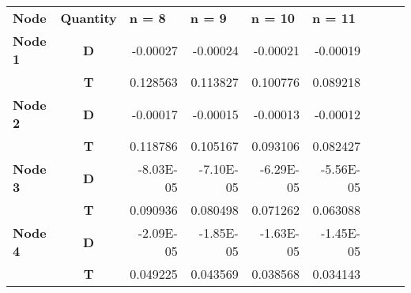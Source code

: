 \begin{table}[htbp]
\begin{tabular}{rcrrrrrrr}
    \midrule
    \multicolumn{1}{l}{\textbf{Node}} & \multicolumn{1}{l}{\textbf{Quantity}} & \multicolumn{1}{l}{\textbf{n = 8}} & \multicolumn{1}{l}{\textbf{n = 9}} & \multicolumn{1}{l}{\textbf{n = 10}} & \multicolumn{1}{l}{\textbf{n = 11}} &       &       &  \\
\cmidrule{1-6}    \multicolumn{1}{l}{\textbf{Node 1}} & \textbf{D} & -0.00027 & -0.00024 & -0.00021 & -0.00019 &       &       &  \\
          & \textbf{T} & 0.128563 & 0.113827 & 0.100776 & 0.089218 &       &       &  \\
    \multicolumn{1}{l}{\textbf{Node 2}} & \textbf{D} & -0.00017 & -0.00015 & -0.00013 & -0.00012 &       &       &  \\
          & \textbf{T} & 0.118786 & 0.105167 & 0.093106 & 0.082427 &       &       &  \\
    \multicolumn{1}{l}{\textbf{Node 3}} & \textbf{D} & -8.03E-05 & -7.10E-05 & -6.29E-05 & -5.56E-05 &       &       &  \\
          & \textbf{T} & 0.090936 & 0.080498 & 0.071262 & 0.063088 &       &       &  \\
    \multicolumn{1}{l}{\textbf{Node 4}} & \textbf{D} & -2.09E-05 & -1.85E-05 & -1.63E-05 & -1.45E-05 &       &       &  \\
          & \textbf{T} & 0.049225 & 0.043569 & 0.038568 & 0.034143 &       &       &  \\
\cmidrule{1-6}    \end{tabular}%
  \label{tab:addlabel}%
\end{table}%

